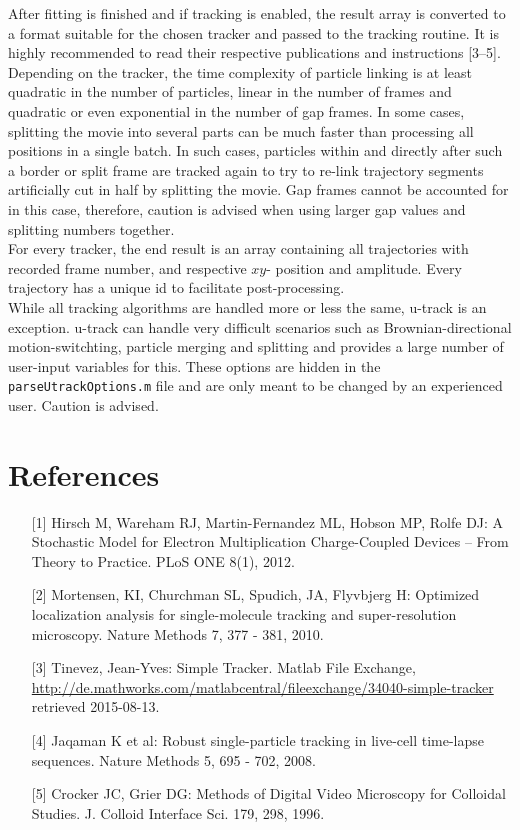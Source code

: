 \documentclass[11pt,onside]{report}
\numberwithin{equation}{chapter}
\begin{document}
 After fitting is finished and if tracking is enabled, the result array is converted to a format suitable for the chosen tracker and passed to the tracking routine. It is highly recommended to read their respective publications and instructions [3{--}5]. Depending on the tracker, the time complexity of particle linking is at least quadratic in the number of particles, linear in the number of frames and quadratic or even exponential in the number of gap frames. In some cases, splitting the movie into several parts can be much faster than processing all positions in a single batch. In such cases, particles within and directly after such a border or split frame are tracked again to try to re-link trajectory segments artificially cut in half by splitting the movie. Gap frames cannot be accounted for in this case, therefore, caution is advised when using larger gap values and splitting numbers together.\\
For every tracker, the end result is an array containing all trajectories with recorded frame number, and respective $xy$- position and amplitude. Every trajectory has a unique id to facilitate post-processing. \\
While all tracking algorithms are handled more or less the same, u-track is an exception. u-track can handle very difficult scenarios such as Brownian-directional motion-switchting, particle merging and splitting and provides a large number of user-input variables for this. These options are hidden in the \texttt{parseUtrackOptions.m} file and are only meant to be changed by an experienced user. Caution is advised.




\section{References}
\begin{itemize}
\item [{[1]}]  Hirsch M, Wareham RJ, Martin-Fernandez ML, Hobson MP, Rolfe DJ: A Stochastic Model for Electron Multiplication Charge-Coupled Devices – From Theory to Practice. PLoS ONE 8(1), 2012.
\item [{[2]}] Mortensen, KI, Churchman SL, Spudich, JA, Flyvbjerg H: Optimized localization analysis for single-molecule tracking and super-resolution microscopy. Nature Methods 7, 377 - 381, 2010.
\item [{[3]}] Tinevez, Jean-Yves: Simple Tracker. Matlab File Exchange, \url{http://de.mathworks.com/matlabcentral/fileexchange/34040-simple-tracker} retrieved 2015-08-13.
\item [{[4]}] Jaqaman K et al: Robust single-particle tracking in live-cell time-lapse sequences. Nature Methods 5, 695 - 702, 2008.
\item [{[5]}] Crocker JC, Grier DG: Methods of Digital Video Microscopy for Colloidal Studies. J. Colloid Interface Sci. 179, 298, 1996. 
\end{itemize}
\end{document}
